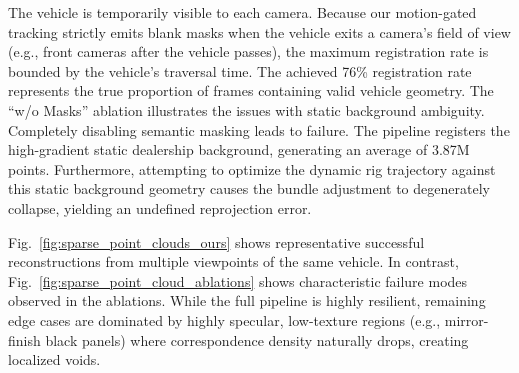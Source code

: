 \documentclass[letterpaper, 10 pt, conference]{ieeeconf}  %
\begin{document}

The vehicle is temporarily visible to each camera. Because our motion-gated tracking strictly emits blank masks when the vehicle exits a camera's field of view (e.g., front cameras after the vehicle passes), the maximum registration rate is bounded by the vehicle's traversal time. The achieved 76\% registration rate represents the true proportion of frames containing valid vehicle geometry. The ``w/o Masks'' ablation illustrates the issues with static background ambiguity. Completely disabling semantic masking leads to failure. The pipeline registers the high-gradient static dealership background, generating an average of 3.87M points. Furthermore, attempting to optimize the dynamic rig trajectory against this static background geometry causes the bundle adjustment to degenerately collapse, yielding an undefined reprojection error. 


Fig.~\ref{fig:sparse_point_clouds_ours} shows representative successful reconstructions from multiple viewpoints of the same vehicle. In contrast, Fig.~\ref{fig:sparse_point_cloud_ablations} shows characteristic failure modes observed in the ablations. While the full pipeline is highly resilient, remaining edge cases are dominated by highly specular, low-texture regions (e.g., mirror-finish black panels) where correspondence density naturally drops, creating localized voids.

\end{document}
